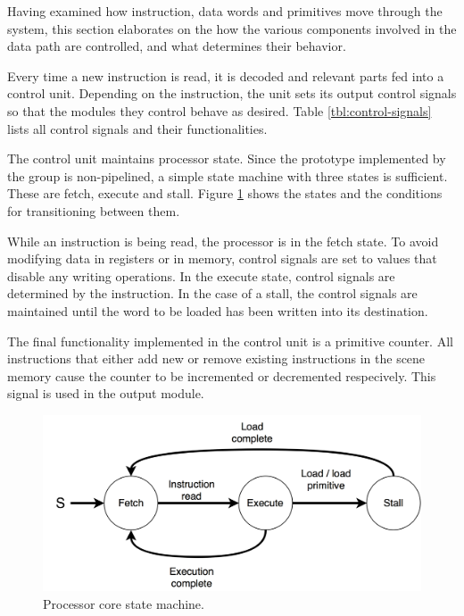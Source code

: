 Having examined how instruction, data words and primitives move through the system, this section elaborates on the how the various components involved in the data path are controlled, and what determines their behavior.

Every time a new instruction is read, it is decoded and relevant parts fed into a control unit.
Depending on the instruction, the unit sets its output control signals so that the modules they control behave as desired.
Table \ref{tbl:control-signals} lists all control signals and their functionalities.

The control unit maintains processor state.
Since the prototype implemented by the group is non-pipelined, a simple state machine with three states is sufficient.
These are fetch, execute and stall.
Figure \ref{fig:state-machine} shows the states and the conditions for transitioning between them.

While an instruction is being read, the processor is in the fetch state.
To avoid modifying data in registers or in memory, control signals are set to values that disable any writing operations.
In the execute state, control signals are determined by the instruction.
In the case of a stall, the control signals are maintained until the word to be loaded has been written into its destination.

The final functionality implemented in the control unit is a primitive counter.
All instructions that either add new or remove existing instructions in the scene memory cause the counter to be incremented or decremented respecively.
This signal is used in the output module.

\begin{figure}[h!]
    \centering
    \includegraphics[width=0.7\linewidth]{images/state-machine.png}
    \caption{Processor core state machine.}
    \label{fig:state-machine}
\end{figure}

